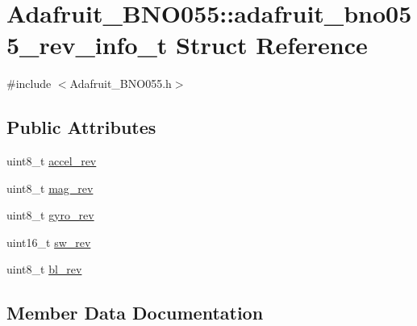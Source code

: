 \hypertarget{structAdafruit__BNO055_1_1adafruit__bno055__rev__info__t}{}\section{Adafruit\+\_\+\+B\+N\+O055\+:\+:adafruit\+\_\+bno055\+\_\+rev\+\_\+info\+\_\+t Struct Reference}
\label{structAdafruit__BNO055_1_1adafruit__bno055__rev__info__t}


{\ttfamily \#include $<$Adafruit\+\_\+\+B\+N\+O055.\+h$>$}

\subsection*{Public Attributes}
\begin{DoxyCompactItemize}
\item 
uint8\+\_\+t \hyperlink{structAdafruit__BNO055_1_1adafruit__bno055__rev__info__t_ad16ef1827302a09c31bcb264ff4579e7}{accel\+\_\+rev}
\item 
uint8\+\_\+t \hyperlink{structAdafruit__BNO055_1_1adafruit__bno055__rev__info__t_ae6ce4bc850654ade8d9978a1354e0532}{mag\+\_\+rev}
\item 
uint8\+\_\+t \hyperlink{structAdafruit__BNO055_1_1adafruit__bno055__rev__info__t_aa93ab742ae73adbec81c47195da38c8c}{gyro\+\_\+rev}
\item 
uint16\+\_\+t \hyperlink{structAdafruit__BNO055_1_1adafruit__bno055__rev__info__t_a2699cc1023a026c17db56f6e2fe289ac}{sw\+\_\+rev}
\item 
uint8\+\_\+t \hyperlink{structAdafruit__BNO055_1_1adafruit__bno055__rev__info__t_a17b2372a03dfcb8eaf9a8fab9d511e48}{bl\+\_\+rev}
\end{DoxyCompactItemize}


\subsection{Member Data Documentation}
